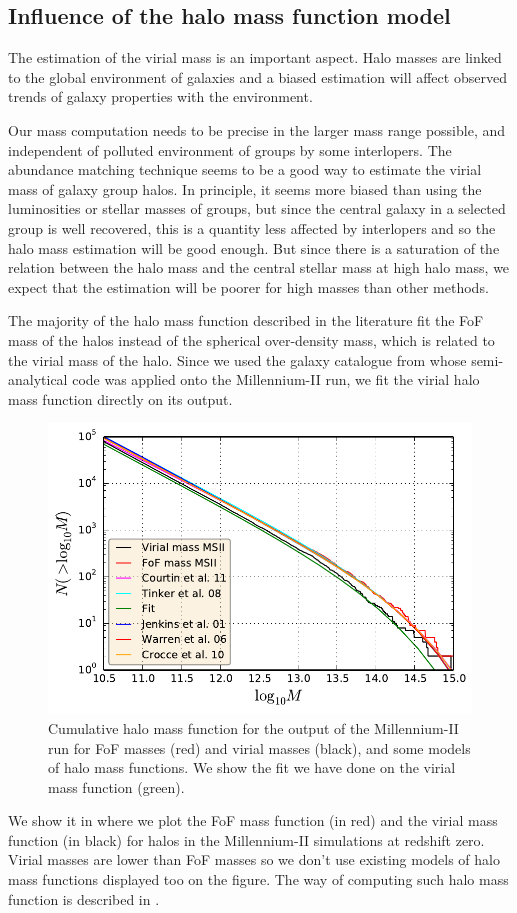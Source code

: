 \subsection{Influence of the halo mass function model}
\label{sub:hmf_test}

The estimation of the virial mass is an important aspect. Halo masses are
linked to the global environment of galaxies and a biased estimation will
affect observed trends of galaxy properties with the environment.

Our mass computation needs to be precise in the larger mass range possible, and
independent of polluted environment of groups by some interlopers. The
abundance matching technique seems to be a good way to estimate the virial mass
of galaxy group halos. In principle, it seems more biased than using the
luminosities or stellar masses of groups, but since the central galaxy in a
selected group is well recovered, this is a quantity less affected by
interlopers and so the halo mass estimation will be good enough. But since
there is a saturation of the relation between the halo mass and the central
stellar mass at high halo mass, we expect that the estimation will be poorer
for high masses than other methods.

The majority of the halo mass function described in the literature fit the FoF
mass of the halos instead of the spherical over-density mass, which is related
to the virial mass of the halo. Since we used the galaxy catalogue from
\citet{Guo+11} whose semi-analytical code was applied onto the Millennium-II
run, we fit the virial halo mass function directly on its output.
%
\begin{figure}[t]
    \centering
    \includegraphics[width=0.6\linewidth]{figures/maggie/hmf.pdf}
    \caption{Cumulative halo mass function for the output of the Millennium-II
    run for FoF masses (red) and virial masses (black), and some models of halo
mass functions. We show the fit we have done on the virial mass function
(green).\label{fig:hmf}}
\end{figure}
%
We show it in  where we plot the FoF mass function (in red)
and the virial mass function (in black) for halos in the Millennium-II
simulations at redshift zero. Virial masses are lower than FoF masses so we
don't use existing models of halo mass functions displayed too on the figure.
The way of computing such halo mass function is described in
.

